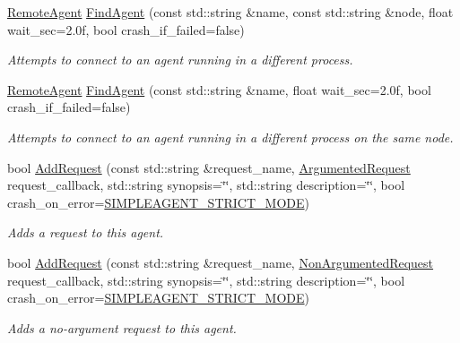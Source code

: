 \begin{DoxyCompactItemize}
\hyperlink{classcubesat_1_1RemoteAgent}{Remote\+Agent} \hyperlink{classcubesat_1_1SimpleAgent_ad4f041659c7c8034b73e10bf19b0b194}{Find\+Agent} (const std\+::string \&name, const std\+::string \&node, float wait\+\_\+sec=2.\+0f, bool crash\+\_\+if\+\_\+failed=false)
\begin{DoxyCompactList}\small\item\em Attempts to connect to an agent running in a different process. \end{DoxyCompactList}\item 
\hyperlink{classcubesat_1_1RemoteAgent}{Remote\+Agent} \hyperlink{classcubesat_1_1SimpleAgent_a55921e8751f7f69c029e60da41ae712c}{Find\+Agent} (const std\+::string \&name, float wait\+\_\+sec=2.\+0f, bool crash\+\_\+if\+\_\+failed=false)
\begin{DoxyCompactList}\small\item\em Attempts to connect to an agent running in a different process on the same node. \end{DoxyCompactList}\item 
bool \hyperlink{classcubesat_1_1SimpleAgent_a3179ea2c99e2a43e528a4a7b80925f57}{Add\+Request} (const std\+::string \&request\+\_\+name, \hyperlink{namespacecubesat_a4fb5bf4788a49408c2c979bb82ae4fe1}{Argumented\+Request} request\+\_\+callback, std\+::string synopsis=\char`\"{}\char`\"{}, std\+::string description=\char`\"{}\char`\"{}, bool crash\+\_\+on\+\_\+error=\hyperlink{SimpleAgent_8h_ae0458b189260d62b7f199e0324dc3cc4}{S\+I\+M\+P\+L\+E\+A\+G\+E\+N\+T\+\_\+\+S\+T\+R\+I\+C\+T\+\_\+\+M\+O\+DE})
\begin{DoxyCompactList}\small\item\em Adds a request to this agent. \end{DoxyCompactList}\item 
bool \hyperlink{classcubesat_1_1SimpleAgent_ac6faf2e25777002281b5833957a8a0b1}{Add\+Request} (const std\+::string \&request\+\_\+name, \hyperlink{namespacecubesat_a494b2feec3d999510e5772da5c0b354c}{Non\+Argumented\+Request} request\+\_\+callback, std\+::string synopsis=\char`\"{}\char`\"{}, std\+::string description=\char`\"{}\char`\"{}, bool crash\+\_\+on\+\_\+error=\hyperlink{SimpleAgent_8h_ae0458b189260d62b7f199e0324dc3cc4}{S\+I\+M\+P\+L\+E\+A\+G\+E\+N\+T\+\_\+\+S\+T\+R\+I\+C\+T\+\_\+\+M\+O\+DE})
\begin{DoxyCompactList}\small\item\em Adds a no-\/argument request to this agent. \end{DoxyCompactList}\item 

\end{DoxyCompactItemize}
